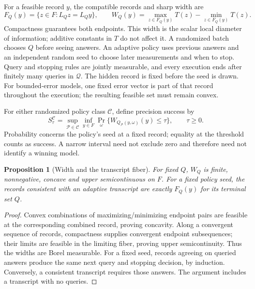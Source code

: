 \documentclass[12pt]{article}
\newtheorem{proposition}{Proposition}
\begin{document}
For a feasible record $y$, the compatible records and sharp width are
\begin{equation}
 F_Q(y)=\{z\in F:L_Qz=L_Qy\},\qquad
 W_Q(y)=\max_{z\in F_Q(y)}T(z)-\min_{z\in F_Q(y)}T(z).
 \label{eq:risk_fiber}
\end{equation}
Compactness guarantees both endpoints. This width is the scalar local
diameter of information; additive constants in $T$ do not affect it.
A randomized batch chooses $Q$ before seeing answers. An adaptive policy
uses previous answers and an independent random seed to choose later
measurements and when to stop. Query and stopping rules are jointly
measurable, and every execution ends after finitely many queries in
$\mathcal Q$. The hidden record is fixed before the seed is drawn.
For bounded-error models, one fixed error vector is part of that record
throughout the execution; the resulting feasible set must remain convex.

For either randomized policy class $\mathcal C$, define precision success by
\begin{equation}
 S_\tau^{\mathcal C}
 =\sup_{\mathcal P\in\mathcal C}\inf_{y\in F}
   \Pr_\omega\{W_{Q_{\mathcal P}(y,\omega)}(y)\leq\tau\},
 \qquad \tau\geq0.
 \label{eq:risk_precision_success}
\end{equation}
Probability concerns the policy's seed at a fixed record; equality at the
threshold counts as success. A narrow interval need not exclude zero and
therefore need not identify a winning model.

\begin{proposition}[Width and the transcript fiber]
\label{prop:risk_concavity_transcript}
For fixed $Q$, $W_Q$ is finite, nonnegative, concave and upper
semicontinuous on $F$. For a fixed policy seed, the records consistent
with an adaptive transcript are exactly $F_Q(y)$ for its terminal set $Q$.
\end{proposition}
\begin{proof}
Convex combinations of maximizing/minimizing endpoint pairs are feasible
at the corresponding combined record, proving concavity. Along a
convergent sequence of records, compactness supplies convergent endpoint
subsequences; their limits are feasible in the limiting fiber, proving
upper semicontinuity. Thus the widths are Borel measurable. For a fixed
seed, records agreeing on queried answers produce the same next query
and stopping decision, by induction. Conversely, a consistent transcript
requires those answers. The argument includes a transcript with no queries.
\end{proof}
\end{document}
